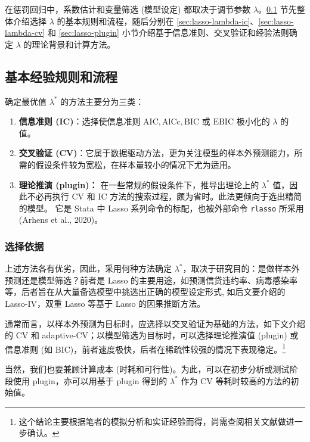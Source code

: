 在惩罚回归中，系数估计和变量筛选 (模型设定) 都取决于调节参数 $\lambda$。\ref{sec:lasso-lambda-intro} 节先整体介绍选择 $\lambda$ 的基本规则和流程，随后分别在 \ref{sec:lasso-lambda-ic}、\ref{sec:lasso-lambda-cv} 和 \ref{sec:lasso-plugin} 小节介绍基于信息准则、交叉验证和经验法则确定 $\lambda$ 的理论背景和计算方法。 

\subsection{基本经验规则和流程}\label{sec:lasso-lambda-intro}

确定最优值 $\lambda^*$ 的方法主要分为三类：
\begin{enumerate}
\item \textbf{信息准则 (IC)}：选择使信息准则 $\mathrm{AIC}, \mathrm{AlCc}, \mathrm{BIC}$ 或 $\mathrm{EBIC}$ 极小化的 $\lambda$ 的值。%
\item \textbf{交叉验证 (CV)}：它属于数据驱动方法，更为关注模型的样本外预测能力，所需的假设条件较为宽松，在样本量较小的情况下尤为适用。%
\item \textbf{理论推演 (plugin)：} 在一些常规的假设条件下，推导出理论上的 $\lambda^*$ 值，因此不必再执行 CV 和 IC 方法的搜索过程，颇为省时。此法更倾向于选出精简的模型。
它是 Stata 中 Lasso 系列命令的标配，也被外部命令 \texttt{rlasso} 所采用 (Arhens et al., 2020)。
\end{enumerate}

\subsubsection{选择依据}
上述方法各有优劣，因此，采用何种方法确定 $\lambda^*$，取决于研究目的：是做样本外预测还是模型筛选？前者是 Lasso 的主要用途，如预测信贷违约率、病毒感染率等，后者旨在从大量备选模型中挑选出正确的模型设定形式, 如后文要介绍的 Lasso-IV，双重 Lasso 等基于 Lasso 的因果推断方法。

通常而言，以样本外预测为目标时，应选择以交叉验证为基础的方法，如下文介绍的 CV 和 adaptive-CV；以模型筛选为目标时，可以选择理论推演值 (plugin) 或信息准则 (如 BIC)，前者速度极快，后者在稀疏性较强的情况下表现稳定。\footnote{%
       这个结论主要根据笔者的模拟分析和实证经验而得，尚需查阅相关文献做进一步确认。}

当然，我们也要兼顾计算成本 (时耗和可行性)。为此，可以在初步分析或测试阶段使用 plugin，亦可以用基于 plugin 得到的 $\lambda^*$ 作为 CV 等耗时较高的方法的初始值。%

